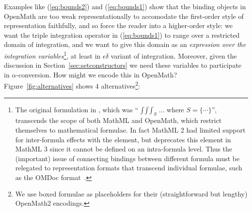 \documentclass{llncs}
\begin{document}
Examples like (\ref{eq:bounds2}) and (\ref{eq:bounds1}) show that the binding objects in
OpenMath are too weak representationally to accomodate the first-order style of
representation faithfully, and so force the reader into a higher-order style: we want the triple
integration operator in (\ref{eq:bounds1}) to range over a restricted domain of
integration, and we want to give this domain as an {\emph{expression over the integration
variables}}\footnote{The original formulation in \cite{Apostol1967}, which was 
``$\mathop{\int\int\int}_S\ldots$ where $S=\{\cdots\}$'', 
  transcends the scope of both MathML and OpenMath, which restrict themselves to
  mathematical formulae. In fact MathML 2 had limited support for inter-formula effects
  with the {} element, but deprecates this element in MathML 3 since it
  cannot be defined on an intra-formula level. Thus the (important) issue of connecting
  bindings between different formula must be relegated to representation formats that
  transcend individual formulae, such as the OMDoc format~\cite{Kohlhase:omdoc1.2}.}, at
least in $\epsilon\delta$ variant of integration. Moreover, given the discussion in
Section~\ref{sec:setconstructors} we need these variables to participate in
$\alpha$-conversion.
How might we encode this in OpenMath? Figure~\ref{fig:alternatives} shows 4
alternatives\footnote{We use boxed formulae as placeholders for their
  (straightforward but lengthy) OpenMath2 encodings.}:
\end{document}
